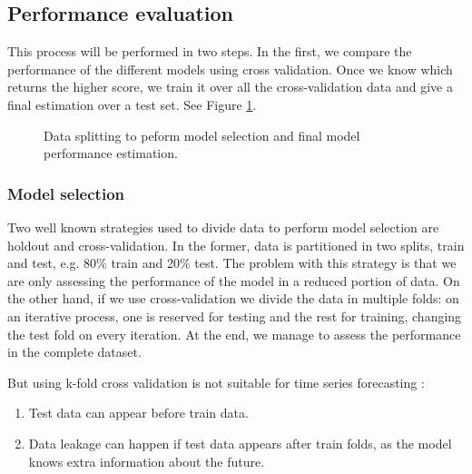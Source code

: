 \subsection{Performance evaluation}
This process will be performed in two steps. In the first, we compare the performance of the different models using cross validation. Once we know which returns the higher score, we train it over all the cross-validation data and give a final estimation over a test set. See Figure \ref{fig:cross-train-test}.

\begin{figure}[H]
\centering
    \caption{Data splitting to peform model selection and final model performance estimation.}
    \label{fig:cross-train-test}
\end{figure}

\subsubsection{Model selection}
Two well known strategies used to divide data to perform model selection are holdout and cross-validation.
In the former, data is partitioned in two splits, train and test, e.g. 80\% train and 20\% test.
The problem with this strategy is that we are only assessing the performance of the model in a reduced portion of data.
On the other hand, if we use cross-validation we divide the data in multiple folds: on an iterative process, one is reserved for testing and the rest for training, changing the test fold on every iteration.
At the end, we manage to assess the performance in the complete dataset.

\noindent But using k-fold cross validation is not suitable for time series forecasting \cite{cross-validation-types}:
\begin{enumerate}
    \item Test data can appear before train data.
    \item Data leakage can happen if test data appears after train folds, as the model knows extra information about the future.
\end{enumerate}

